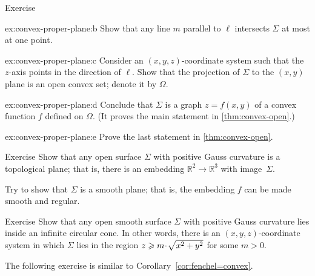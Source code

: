 {\begin{thm}{Exercise}
\begin{subthm}{ex:convex-proper-plane:b}
Show that any line $m$ parallel to $\ell$ intersects $\Sigma$ at most at one point.
\end{subthm}


\begin{subthm}{ex:convex-proper-plane:c}
Consider an $(x,y,z)$-coordinate system such that the $z$-axis points in the direction of $\ell$.
Show that the projection of $\Sigma$ to the $(x,y)$ plane is an open convex set; denote it by $\Omega$.
\end{subthm}

\begin{subthm}{ex:convex-proper-plane:d}
Conclude that $\Sigma$ is a graph $z=f(x,y)$ of a convex function $f$ defined on $\Omega$.
(It proves the main statement in \ref{thm:convex-open}.)
\end{subthm}

\begin{subthm}{ex:convex-proper-plane:e}
Prove the last statement in \ref{thm:convex-open}.
\end{subthm}


\end{thm}



}

\begin{thm}{Exercise}\label{ex:open+convex=plane}
Show that any open surface $\Sigma$ with positive Gauss curvature is a topological plane;
that is, there is an embedding $\mathbb{R}^2\to\mathbb{R}^3$ with image~$\Sigma$.

Try to show that $\Sigma$ is a smooth plane;
that is, the embedding $f$ can be made smooth and regular.
\end{thm}

\begin{thm}{Exercise}\label{ex:circular-cone}
Show that any open smooth surface $\Sigma$ with positive Gauss curvature
lies inside an infinite circular cone. In other words, there is an $(x,y,z)$-coordinate system in which $\Sigma$ lies in the region $z \z\ge m \cdot\sqrt{x^2 + y^2}$ for some $m > 0$.
\end{thm} 

The following exercise is similar to Corollary~\ref{cor:fenchel=convex}.

